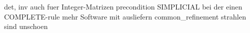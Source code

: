 det, inv auch fuer Integer-Matrizen
precondition SIMPLICIAL bei der einen COMPLETE-rule
mehr Software mit ausliefern
common_refinement strahlen sind unschoen
